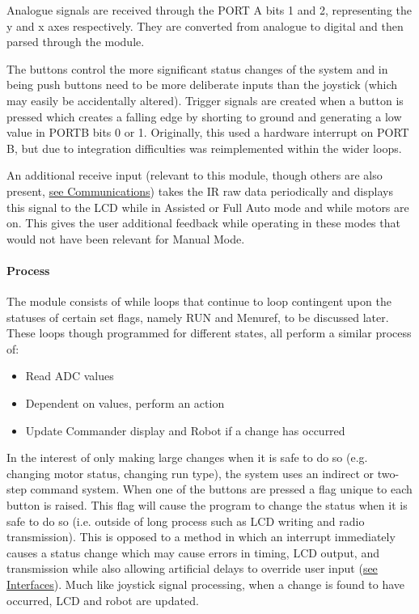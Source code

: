 \documentclass{article}
\begin{document}
	Analogue signals are received through the PORT A bits 1 and 2, representing the y and x axes respectively. They are converted from analogue to digital and then parsed through the module.
	
	The buttons control the more significant status changes of the system and in being push buttons need to be more deliberate inputs than the joystick (which may easily be accidentally altered). Trigger signals are created when a button is pressed which creates a falling edge by shorting to ground and generating a low value in PORTB bits 0 or 1. Originally, this used a hardware interrupt on PORT B, but due to integration difficulties was reimplemented within the wider loops.
	
	An additional receive input (relevant to this module, though others are also present, \underline{see Communications}) takes the IR raw data periodically and displays this signal to the LCD while in Assisted or Full Auto mode and while motors are on. This gives the user additional feedback while operating in these modes that would not have been relevant for Manual Mode. 
	
	
	\paragraph{Process}
		
	The module consists of while loops that continue to loop contingent upon the statuses of certain set flags, namely RUN and Menu\textunderscore ref, to be discussed later. These loops though programmed for different states, all perform a similar process of:
	\begin{itemize}
		\item Read ADC values
		\item Dependent on values, perform an action
		\item Update Commander display and Robot if a change has occurred
	\end{itemize}
	
	In the interest of only making large changes when it is safe to do so (e.g. changing motor status, changing run type), the system uses an indirect or two-step command system. When one of the buttons are pressed a flag unique to each button is raised. This flag will cause the program to change the status when it is safe to do so (i.e. outside of long process such as LCD writing and radio transmission). This is opposed to a method in which an interrupt immediately causes a status change which may cause errors in timing, LCD output, and transmission while also allowing artificial delays to override user input (\underline{see Interfaces}). Much like joystick signal processing, when a change is found to have occurred, LCD and robot are updated.\\
	
\end{document}
